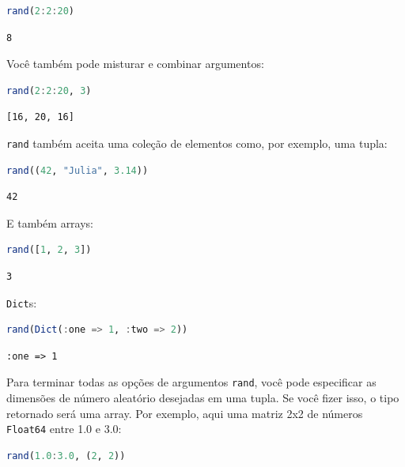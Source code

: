 \documentclass[
  notoc %
]{tufte-book}
\newcommand{\passthrough}[1]{#1}
\begin{document}
\begin{lstlisting}[language=Julia]
rand(2:2:20)
\end{lstlisting}

\begin{lstlisting}[language=Output]
8
\end{lstlisting}

Você também pode misturar e combinar argumentos:

\begin{lstlisting}[language=Julia]
rand(2:2:20, 3)
\end{lstlisting}

\begin{lstlisting}[language=Output]
[16, 20, 16]
\end{lstlisting}

\passthrough{\lstinline!rand!} também aceita uma coleção de elementos
como, por exemplo, uma tupla:

\begin{lstlisting}[language=Julia]
rand((42, "Julia", 3.14))
\end{lstlisting}

\begin{lstlisting}[language=Output]
42
\end{lstlisting}

E também arrays:

\begin{lstlisting}[language=Julia]
rand([1, 2, 3])
\end{lstlisting}

\begin{lstlisting}[language=Output]
3
\end{lstlisting}

\passthrough{\lstinline!Dict!}s:

\begin{lstlisting}[language=Julia]
rand(Dict(:one => 1, :two => 2))
\end{lstlisting}

\begin{lstlisting}[language=Output]
:one => 1
\end{lstlisting}

Para terminar todas as opções de argumentos
\passthrough{\lstinline!rand!}, você pode especificar as dimensões de
número aleatório desejadas em uma tupla. Se você fizer isso, o tipo
retornado será uma array. Por exemplo, aqui uma matriz 2x2 de números
\passthrough{\lstinline!Float64!} entre 1.0 e 3.0:

\begin{lstlisting}[language=Julia]
rand(1.0:3.0, (2, 2))
\end{lstlisting}
\end{document}
